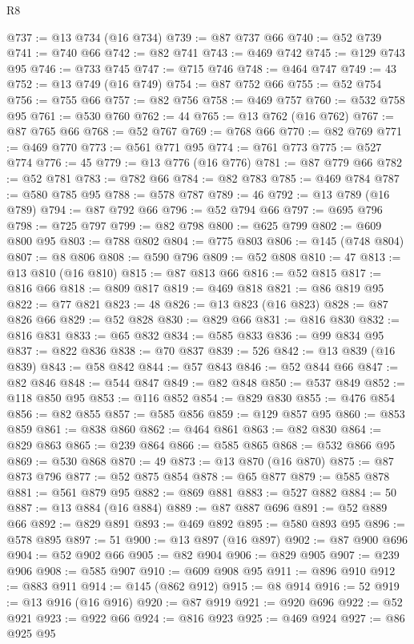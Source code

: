 \begin{lexlean}{R8}
\begin{coremodule}
@737 := @13 @734 (@16 @734)
@739 := @87 @737 @66
@740 := @52 @739
@741 := @740 @66
@742 := @82 @741
@743 := @469 @742
@745 := @129 @743 @95
@746 := @733 @745
@747 := @715 @746
@748 := @464 @747
@749 := 43
@752 := @13 @749 (@16 @749)
@754 := @87 @752 @66
@755 := @52 @754
@756 := @755 @66
@757 := @82 @756
@758 := @469 @757
@760 := @532 @758 @95
@761 := @530 @760
@762 := 44
@765 := @13 @762 (@16 @762)
@767 := @87 @765 @66
@768 := @52 @767
@769 := @768 @66
@770 := @82 @769
@771 := @469 @770
@773 := @561 @771 @95
@774 := @761 @773
@775 := @527 @774
@776 := 45
@779 := @13 @776 (@16 @776)
@781 := @87 @779 @66
@782 := @52 @781
@783 := @782 @66
@784 := @82 @783
@785 := @469 @784
@787 := @580 @785 @95
@788 := @578 @787
@789 := 46
@792 := @13 @789 (@16 @789)
@794 := @87 @792 @66
@796 := @52 @794 @66
@797 := @695 @796
@798 := @725 @797
@799 := @82 @798
@800 := @625 @799
@802 := @609 @800 @95
@803 := @788 @802
@804 := @775 @803
@806 := @145 (@748 @804)
@807 := @8 @806
@808 := @590 @796
@809 := @52 @808
@810 := 47
@813 := @13 @810 (@16 @810)
@815 := @87 @813 @66
@816 := @52 @815
@817 := @816 @66
@818 := @809 @817
@819 := @469 @818
@821 := @86 @819 @95
@822 := @77 @821
@823 := 48
@826 := @13 @823 (@16 @823)
@828 := @87 @826 @66
@829 := @52 @828
@830 := @829 @66
@831 := @816 @830
@832 := @816 @831
@833 := @65 @832
@834 := @585 @833
@836 := @99 @834 @95
@837 := @822 @836
@838 := @70 @837
@839 := 526
@842 := @13 @839 (@16 @839)
@843 := @58 @842
@844 := @57 @843
@846 := @52 @844 @66
@847 := @82 @846
@848 := @544 @847
@849 := @82 @848
@850 := @537 @849
@852 := @118 @850 @95
@853 := @116 @852
@854 := @829 @830
@855 := @476 @854
@856 := @82 @855
@857 := @585 @856
@859 := @129 @857 @95
@860 := @853 @859
@861 := @838 @860
@862 := @464 @861
@863 := @82 @830
@864 := @829 @863
@865 := @239 @864
@866 := @585 @865
@868 := @532 @866 @95
@869 := @530 @868
@870 := 49
@873 := @13 @870 (@16 @870)
@875 := @87 @873 @796
@877 := @52 @875 @854
@878 := @65 @877
@879 := @585 @878
@881 := @561 @879 @95
@882 := @869 @881
@883 := @527 @882
@884 := 50
@887 := @13 @884 (@16 @884)
@889 := @87 @887 @696
@891 := @52 @889 @66
@892 := @829 @891
@893 := @469 @892
@895 := @580 @893 @95
@896 := @578 @895
@897 := 51
@900 := @13 @897 (@16 @897)
@902 := @87 @900 @696
@904 := @52 @902 @66
@905 := @82 @904
@906 := @829 @905
@907 := @239 @906
@908 := @585 @907
@910 := @609 @908 @95
@911 := @896 @910
@912 := @883 @911
@914 := @145 (@862 @912)
@915 := @8 @914
@916 := 52
@919 := @13 @916 (@16 @916)
@920 := @87 @919
@921 := @920 @696
@922 := @52 @921
@923 := @922 @66
@924 := @816 @923
@925 := @469 @924
@927 := @86 @925 @95

\end{coremodule}
\end{lexlean}
